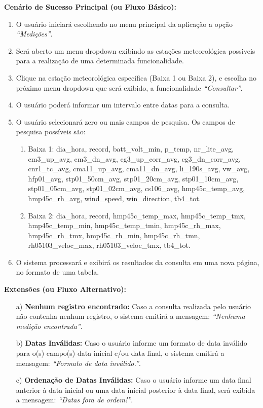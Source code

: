\begin{mdframed}
\begin{flushleft}
		\textbf{Cenário de Sucesso Principal (ou Fluxo Básico):}\\
			\begin{enumerate}
				\item{O usuário iniciará escolhendo no menu principal da aplicação a opção \textit{``Medições''}.}
				\item{Será aberto um menu dropdown exibindo as estações meteorológica possiveis para a realização de uma determinada funcionalidade.}
				\item{Clique na estação meteorológica específica (Baixa 1 ou Baixa 2), e escolha no próximo menu dropdown que será exibido, a funcionalidade \textit{``Consultar''}.}
			 	\item O usuário poderá informar um intervalo entre datas para a consulta.
			 	\item O usuário selecionará zero ou mais campos de pesquisa. Os campos de pesquisa possíveis são:
				\begin{enumerate}
					\item Baixa 1: {dia\_hora, record, batt\_volt\_min, p\_temp, nr\_lite\_avg, cm3\_up\_avg, cm3\_dn\_avg, cg3\_up\_corr\_avg, cg3\_dn\_corr\_avg, cnr1\_tc\_avg, cma11\_up\_avg, cma11\_dn\_avg, li\_190s\_avg, vw\_avg, hfp01\_avg, stp01\_50cm\_avg, stp01\_20cm\_avg, stp01\_10cm\_avg, stp01\_05cm\_avg, stp01\_02cm\_avg, cs106\_avg, hmp45c\_temp\_avg, hmp45c\_rh\_avg, wind\_speed, win\_direction, tb4\_tot.}
					\item Baixa 2:  {dia\_hora, record, hmp45c\_temp\_max, hmp45c\_temp\_tmx, hmp45c\_temp\_min, hmp45c\_temp\_tmin, hmp45c\_rh\_max, hmp45c\_rh\_tmx, hmp45c\_rh\_min, hmp45c\_rh\_tmn, rh05103\_veloc\_max, rh05103\_veloc\_tmx, tb4\_tot.}
				\end{enumerate}
			 	\item{O sistema processará e exibirá os resultados da consulta em uma nova página, no formato de uma tabela.}
			 \end{enumerate}

		\textbf{Extensões (ou Fluxo Alternativo):}
		\begin{itemize}
			\item[a)] \textbf{Nenhum registro encontrado:} Caso a consulta realizada pelo usuário não contenha nenhum registro, o sistema emitirá a mensagem: \textit{``Nenhuma medição encontrada''}.
			\item[b)] \textbf{Datas Inválidas:} Caso o usuário informe um formato de data inválido para o(s) campo(s) data inicial e/ou data final, o sistema emitirá a mensagem: \textit{``Formato de data inválido.''}.
			\item[c)] \textbf{Ordenação de Datas Inválidas:} Caso o usuário informe um data final anterior à data inicial ou uma data inicial posterior à data final, será exibida a mensagem: \textit{``Datas fora de ordem!''}.
		\end{itemize}


\end{flushleft}
\end{mdframed}
